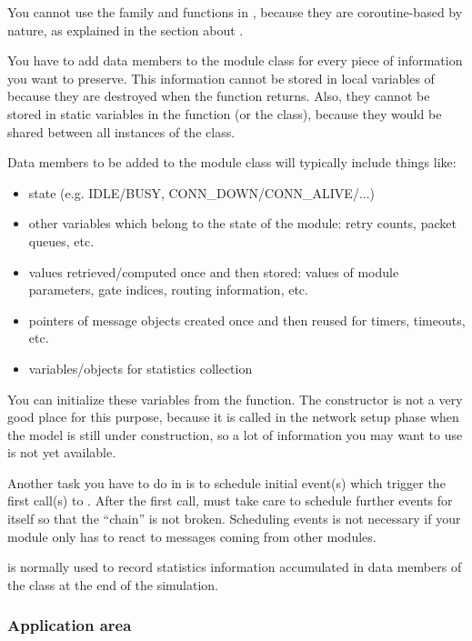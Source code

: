 You cannot use the  family and
 functions in , because they are
coroutine-based by nature, as explained in the section about
.

You have to add data members to the module class for every piece
of information you want to preserve. This information cannot
be stored in local variables of  because they
are destroyed when the function returns. Also, they cannot be
stored in static variables in the function (or the class), because
they would be shared between all instances of the class.


Data members to be added to the module class will typically include
things like:

\begin{itemize}
  \item{state (e.g. IDLE/BUSY, CONN\_DOWN/CONN\_ALIVE/...)}
  \item{other variables which belong to the state of the module: retry
    counts, packet queues, etc.}
  \item{values retrieved/computed once and then stored: values of module
    parameters, gate indices, routing information, etc.}
  \item{pointers of message objects created once and then reused for
    timers, timeouts, etc.}
  \item{variables/objects for statistics collection}
\end{itemize}

You can initialize these variables from the 
function.  The constructor is not a very good place
for this purpose, because it is called in the network setup phase when
the model is still under construction, so a lot of information you may
want to use is not yet available.

Another task you have to do in  is to schedule
initial event(s) which trigger the first call(s)
to .  After the first call,
 must take care to schedule further events for
itself so that the ``chain'' is not broken. Scheduling events is not
necessary if your module only has to react to messages coming from
other modules.

 is normally used to record statistics information
accumulated in data members of the class at the end of the simulation.


\subsubsection{Application area}


